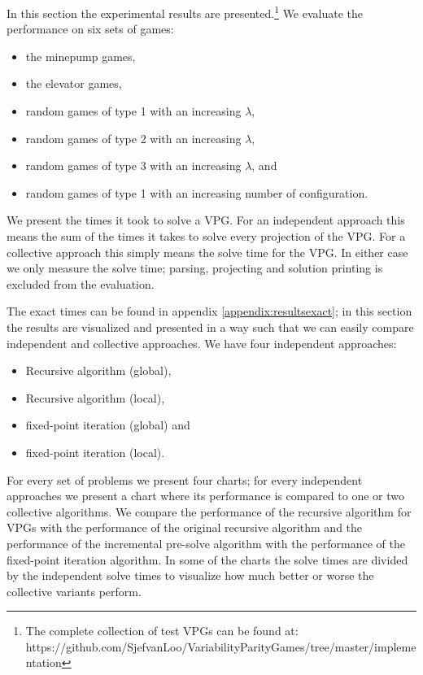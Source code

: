 In this section the experimental results are presented.\footnote{\label{note1}The complete collection of test VPGs can be found at:\\ https://github.com/SjefvanLoo/VariabilityParityGames/tree/master/implementation} We evaluate the performance on six sets of games:
\begin{itemize}
	\item the minepump games,
	\item the elevator games,
	\item random games of type 1 with an increasing $\lambda$,
	\item random games of type 2 with an increasing $\lambda$,
	\item random games of type 3 with an increasing $\lambda$, and
	\item random games of type 1 with an increasing number of configuration.
\end{itemize}

We present the times it took to solve a VPG. For an independent approach this means the sum of the times it takes to solve every projection of the VPG. For a collective approach this simply means the solve time for the VPG. In either case we only measure the solve time; parsing, projecting and solution printing is excluded from the evaluation.

The exact times can be found in appendix \ref{appendix:resultsexact}; in this section the results are visualized and presented in a way such that we can easily compare independent and collective approaches. We have four independent approaches:
\begin{itemize}
	\item Recursive algorithm (global),
	\item Recursive algorithm (local),
	\item fixed-point iteration (global) and
	\item fixed-point iteration (local).
\end{itemize}
For every set of problems we present four charts; for every independent approaches we present a chart where its performance is compared to one or two collective algorithms. We compare the performance of the recursive algorithm for VPGs with the performance of the original recursive algorithm and the performance of the incremental pre-solve algorithm with the performance of the fixed-point iteration algorithm. In some of the charts the solve times are divided by the independent solve times to visualize how much better or worse the collective variants perform.

